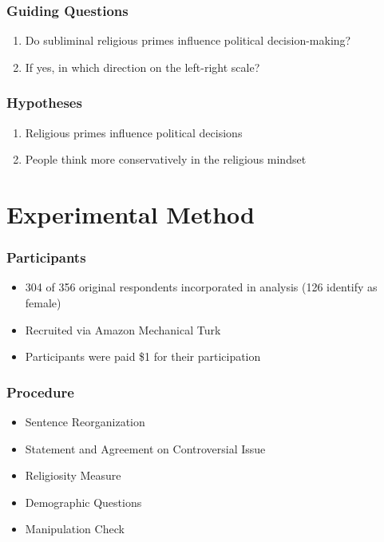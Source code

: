 \documentclass[14pt]{beamer}
\begin{document}
\begin{frame}
\frametitle{Guiding Questions}
\begin{enumerate}
	\item Do subliminal religious primes influence political decision-making?
	\item If yes, in which direction on the left-right scale?
\end{enumerate}
\end{frame}

\begin{frame}
\frametitle{Hypotheses}
\begin{enumerate}
	\item Religious primes influence political decisions
	\item People think more conservatively in the religious mindset
\end{enumerate}
\end{frame}

\section{Experimental Method}

\begin{frame}
\frametitle{Participants}
\begin{itemize}
	\item 304 of 356 original respondents incorporated in analysis (126 identify as female)
	\item Recruited via Amazon Mechanical Turk
	\item Participants were paid \$1 for their participation
\end{itemize}
\end{frame}

\begin{frame}
\frametitle{Procedure}
\begin{itemize}
	\item Sentence Reorganization
	\item Statement and Agreement on Controversial Issue
	\item Religiosity Measure
	\item Demographic Questions
	\item Manipulation Check
\end{itemize}
\end{frame}
\end{document}
